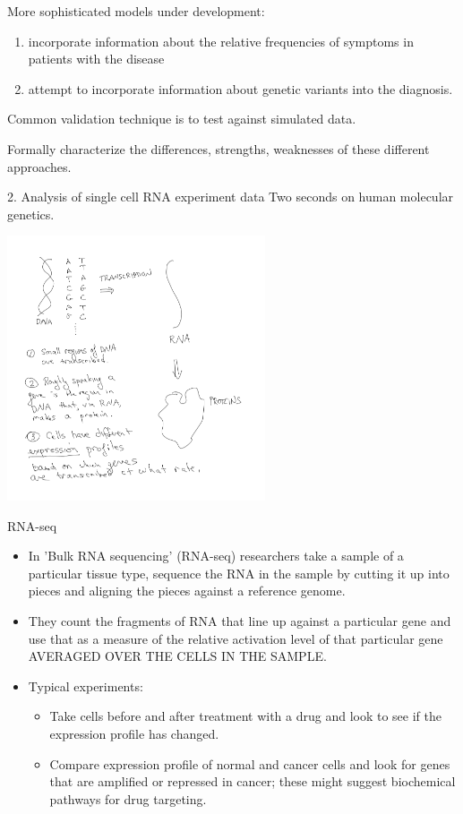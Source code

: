 \documentclass{beamer}
\begin{document}
\begin{frame}
More sophisticated models under development:
\begin{enumerate}
\item incorporate information about the relative frequencies of symptoms in patients with the disease
\item attempt to incorporate information about genetic variants into the diagnosis.
\end{enumerate}

Common validation technique is to test against simulated data.
\begin{problem}
Formally characterize the differences, strengths, weaknesses of these different approaches.
\end{problem}
\end{frame}
\begin{frame}{2. Analysis of single cell RNA experiment data}
  Two seconds on human molecular genetics.
\begin{center}
  \includegraphics[width=3in]{dna.png}
\end{center}
\end{frame}
\begin{frame}{RNA-seq}
\begin{itemize}
\item  In 'Bulk RNA sequencing' (RNA-seq) researchers take a sample of a particular tissue type, sequence the RNA in the sample by cutting it up into pieces and aligning the pieces against a reference genome.
\item They count the fragments of RNA that line up against a particular gene and use that as a measure of the relative activation level of that particular gene AVERAGED OVER THE CELLS IN THE SAMPLE.
\item Typical experiments:
  \begin{itemize}
  \item Take cells before and after treatment with a drug and look to see if the expression profile has changed.
  \item Compare expression profile of normal and cancer cells and look for genes that are amplified or repressed in cancer; these might suggest biochemical pathways for drug targeting.
  \end{itemize}
\end{itemize}
\end{frame}
\end{document}
